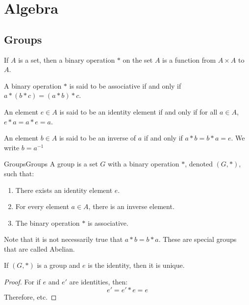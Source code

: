 \section{Algebra}
    \subsection{Groups}
        \begin{definition}
        If $A$ is a set, then a binary operation $*$ on the set $A$ is a function from $A\times A$ to $A$.
        \end{definition}
        \begin{definition}
        A binary operation $*$ is said to be associative if and only if $a*(b*c) = (a*b)*c$.
        \end{definition}
        \begin{definition}
        An element $e\in A$ is said to be an identity element if and only if for all $a\in A$, $e*a = a*e = a$.
        \end{definition}
        \begin{definition}
        An element $b\in A$ is said to be an inverse of $a$ if and only if $a*b=b*a = e$. We write $b=a^{-1}$
        \end{definition}
        \begin{ldefinition}{Groups}{Groups}
            A group is a set $G$ with a binary operation $*$,
            denoted $(G,*)$, such that:
            \begin{enumerate}
                \item There exists an identity element $e$.
                \item For every element $a\in{A}$, there is an inverse element.
                \item The binary operation $*$ is associative.
            \end{enumerate}
        \end{ldefinition}
        Note that it is not necessarily true that $a*b = b*a$.
        These are special groups that are called Abelian.
        \begin{theorem}
            If $(G,*)$ is a group and $e$ is the identity, then it is unique.
        \end{theorem}
        \begin{proof}
            For if $e$ and $e'$ are identities, then:
            \begin{equation}
                e'=e'*e=e
            \end{equation}
            Therefore, etc.
        \end{proof}
